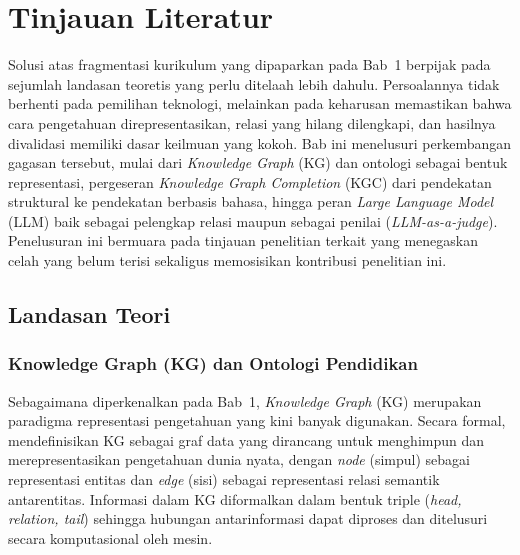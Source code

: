 \documentclass[../../thesis]{subfiles}
\begin{document}
\ifSubfilesClassLoaded{}{\setcounter{chapter}{1}}

\chapter{Tinjauan Literatur}

Solusi atas fragmentasi kurikulum yang dipaparkan pada Bab~1 berpijak pada
sejumlah landasan teoretis yang perlu ditelaah lebih dahulu. Persoalannya tidak
berhenti pada pemilihan teknologi, melainkan pada keharusan memastikan bahwa
cara pengetahuan direpresentasikan, relasi yang hilang dilengkapi, dan hasilnya
divalidasi memiliki dasar keilmuan yang kokoh. Bab ini menelusuri perkembangan
gagasan tersebut, mulai dari \textit{Knowledge Graph} (KG) dan ontologi sebagai
bentuk representasi, pergeseran \textit{Knowledge Graph Completion} (KGC) dari
pendekatan struktural ke pendekatan berbasis bahasa, hingga peran
\textit{Large Language Model} (LLM) baik sebagai pelengkap relasi maupun sebagai
penilai (\textit{LLM-as-a-judge}). Penelusuran ini bermuara pada tinjauan
penelitian terkait yang menegaskan celah yang belum terisi sekaligus
memosisikan kontribusi penelitian ini.

\section{Landasan Teori}

\subsection{Knowledge Graph (KG) dan Ontologi Pendidikan}
\label{subsec:kg-ontologi}

Sebagaimana diperkenalkan pada Bab~1, \textit{Knowledge Graph} (KG) merupakan
paradigma representasi pengetahuan yang kini banyak digunakan. Secara formal,
\textcite{hogan_knowledge_2022} mendefinisikan KG sebagai graf data yang
dirancang untuk menghimpun dan merepresentasikan pengetahuan dunia nyata, dengan
\textit{node} (simpul) sebagai representasi entitas dan \textit{edge} (sisi)
sebagai representasi relasi semantik antarentitas. Informasi dalam KG
diformalkan dalam bentuk triple (\textit{head, relation, tail}) sehingga
hubungan antarinformasi dapat diproses dan ditelusuri secara komputasional oleh
mesin.
\end{document}
